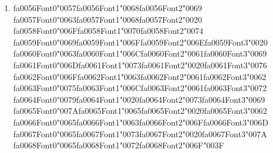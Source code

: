 \documentclass[12pt]{article}
\begin{document}
\begin{enumerate}[label=Q\arabic*.]
\begin{enumerate}[label=(\Alph*)]
    \item A technique that compresses text by replacing consecutive repeated characters with a count and a symbol
    \item A tokenization method that iteratively merges the most frequent pair of symbols in a corpus
    \item A tokenization method that splits text based on whitespace and punctuation
    \item A character-level encoding scheme that assigns fixed-length binary codes to characters
\end{enumerate}
\item {\csname fa0056Font0\endcsname\char"0057}{\csname fa0056Font1\endcsname\char"0068}{\csname fa0056Font2\endcsname\char"0069} {\csname fa0057Font0\endcsname\char"0063}{\csname fa0057Font1\endcsname\char"0068}{\csname fa0057Font2\endcsname\char"0020} {\csname fa0058Font0\endcsname\char"006F}{\csname fa0058Font1\endcsname\char"0070}{\csname fa0058Font2\endcsname\char"0074} {\csname fa0059Font0\endcsname\char"0069}{\csname fa0059Font1\endcsname\char"006F}{\csname fa0059Font2\endcsname\char"006E}{\csname fa0059Font3\endcsname\char"0020} {\csname fa0060Font0\endcsname\char"0063}{\csname fa0060Font1\endcsname\char"006C}{\csname fa0060Font2\endcsname\char"0061}{\csname fa0060Font3\endcsname\char"0069} {\csname fa0061Font0\endcsname\char"006D}{\csname fa0061Font1\endcsname\char"0073}{\csname fa0061Font2\endcsname\char"0020}{\csname fa0061Font3\endcsname\char"0076} {\csname fa0062Font0\endcsname\char"006F}{\csname fa0062Font1\endcsname\char"0063}{\csname fa0062Font2\endcsname\char"0061}{\csname fa0062Font3\endcsname\char"0062} {\csname fa0063Font0\endcsname\char"0075}{\csname fa0063Font1\endcsname\char"006C}{\csname fa0063Font2\endcsname\char"0061}{\csname fa0063Font3\endcsname\char"0072} {\csname fa0064Font0\endcsname\char"0079}{\csname fa0064Font1\endcsname\char"0020}{\csname fa0064Font2\endcsname\char"0073}{\csname fa0064Font3\endcsname\char"0069} {\csname fa0065Font0\endcsname\char"007A}{\csname fa0065Font1\endcsname\char"0065}{\csname fa0065Font2\endcsname\char"0020}{\csname fa0065Font3\endcsname\char"0062} {\csname fa0066Font0\endcsname\char"0065}{\csname fa0066Font1\endcsname\char"0063}{\csname fa0066Font2\endcsname\char"006F}{\csname fa0066Font3\endcsname\char"006D} {\csname fa0067Font0\endcsname\char"0065}{\csname fa0067Font1\endcsname\char"0073}{\csname fa0067Font2\endcsname\char"0020}{\csname fa0067Font3\endcsname\char"007A} {\csname fa0068Font0\endcsname\char"0065}{\csname fa0068Font1\endcsname\char"0072}{\csname fa0068Font2\endcsname\char"006F}{\char"003F}

\end{enumerate}
\end{document}
